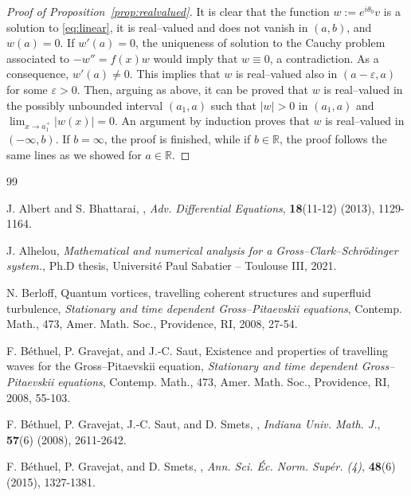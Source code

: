 \documentclass[11pt]{article}
\newcommand{\R}{\mathbb{R}}
\theoremstyle{plain}
\theoremstyle{definition}
\theoremstyle{remark}
\numberwithin{equation}{section}
\begin{document}
{\begin{proof}[Proof of Proposition~\ref{prop:realvalued}]
    It is clear that the function $w:=e^{i\theta_0}v$ is a solution to \eqref{eq:linear}, it is real--valued and does not vanish in $(a,b)$, and $w(a)=0$. If $w'(a)=0$, the uniqueness of solution to the Cauchy problem associated to $-w''=f(x)w$ would imply that $w\equiv 0$, a contradiction. As a consequence, $w'(a)\not=0$. This implies that $w$ is real--valued also in $(a-\varepsilon,a)$ for some $\varepsilon>0$. Then, arguing as above, it can be proved that $w$ is real--valued in the possibly unbounded interval $(a_1,a)$ such that $|w|>0$ in $(a_1,a)$ and $\lim_{x\to a_1^+}|w(x)|=0$. An argument by induction proves that $w$ is real--valued in $(-\infty,b)$. If $b=\infty$, the proof is finished, while if $b\in\R$, the proof follows the same lines as we showed for $a\in\R$.
\end{proof}



\begin{thebibliography}{99}

\newblock J. Albert and S. Bhattarai,
,
\newblock \emph{Adv. Differential Equations}, \textbf{18}(11-12) (2013), 1129-1164.

\newblock J. Alhelou,
\newblock \emph{Mathematical and numerical analysis for a Gross--Clark--Schrödinger system.},
\newblock Ph.D thesis, Universit\'e Paul Sabatier -- Toulouse III, 2021.

\newblock N. Berloff,
\newblock Quantum vortices, travelling coherent structures and superfluid turbulence,
\newblock \emph{Stationary and time dependent Gross--Pitaevskii equations}, Contemp. Math., 473, Amer. Math. Soc., Providence, RI, 2008, 27-54.

\newblock F. B\'ethuel, P. Gravejat, and J.-C. Saut,
\newblock Existence and properties of travelling waves for the Gross--Pitaevskii equation,
\newblock \emph{Stationary and time dependent Gross--Pitaevskii equations}, Contemp. Math., 473, Amer. Math. Soc., Providence, RI, 2008, 55-103.

\newblock F. B\'ethuel, P. Gravejat, J.-C. Saut, and D. Smets,
,
\newblock \emph{Indiana Univ. Math. J.}, \textbf{57}(6) (2008), 2611-2642.

\newblock F. B\'ethuel, P. Gravejat, and D. Smets,
,
\newblock \emph{Ann. Sci. \'Ec. Norm. Sup\'er. (4)}, \textbf{48}(6) (2015), 1327-1381.


\end{thebibliography}}
\end{document}
